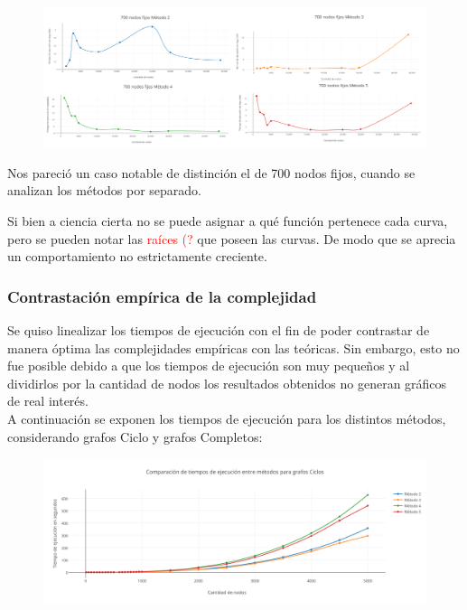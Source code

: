    \begin{figure}[h!]
   \begin{center}
 	\includegraphics[scale=0.08]{imagenes/local/tiempos/700nodos2.png}
   \end{center}
 \end{figure} 
 
Nos pareci\'o un caso notable de distinci\'on el de 700 nodos fijos, cuando se analizan los m\'etodos por separado. 

Si bien a ciencia cierta no se puede asignar a qu\'e funci\'on pertenece cada curva, pero se pueden notar las \textcolor{red}{ra\'ices (?} que poseen las curvas. De modo que se aprecia un comportamiento no estrictamente creciente. 

 \newpage
\subsubsection{Contrastaci\'on emp\'irica de la complejidad}

Se quiso linealizar los tiempos de ejecuci\'on con el fin de poder contrastar de manera \'optima las complejidades emp\'iricas con las te\'oricas. Sin embargo, esto no fue posible debido a que los tiempos de ejecuci\'on son muy peque\~nos y al dividirlos por la cantidad de nodos los resultados obtenidos no generan gr\'aficos de real inter\'es.\\

A continuaci\'on se exponen los tiempos de ejecuci\'on para los distintos m\'etodos, considerando grafos Ciclo y grafos Completos:

  \begin{figure}[h!]
   \begin{center}
 	\includegraphics[scale=0.55]{imagenes/local/tiempos/ciclos.png}
   \end{center}
 \end{figure} 
 
